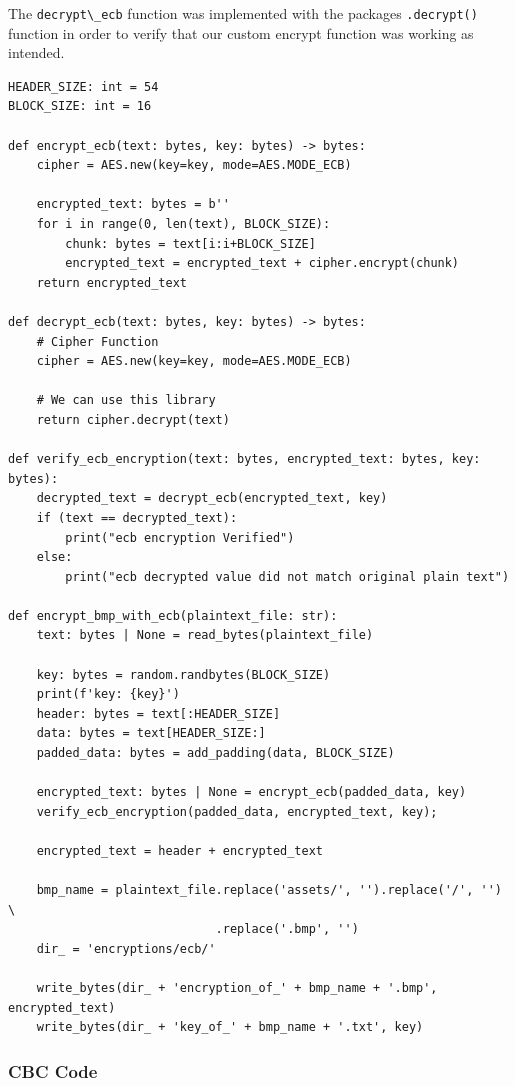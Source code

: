\documentclass[11pt]{article}
\begin{document}
The \verb|decrypt\_ecb| function was implemented with the packages \verb|.decrypt()| function in order to verify that our custom encrypt function was working as intended.

\begin{framed}
\begin{verbatim}
HEADER_SIZE: int = 54
BLOCK_SIZE: int = 16

def encrypt_ecb(text: bytes, key: bytes) -> bytes:
    cipher = AES.new(key=key, mode=AES.MODE_ECB)

    encrypted_text: bytes = b''
    for i in range(0, len(text), BLOCK_SIZE):
        chunk: bytes = text[i:i+BLOCK_SIZE]
        encrypted_text = encrypted_text + cipher.encrypt(chunk)
    return encrypted_text 

def decrypt_ecb(text: bytes, key: bytes) -> bytes:
    # Cipher Function
    cipher = AES.new(key=key, mode=AES.MODE_ECB)
    
    # We can use this library
    return cipher.decrypt(text)

def verify_ecb_encryption(text: bytes, encrypted_text: bytes, key: bytes):
    decrypted_text = decrypt_ecb(encrypted_text, key)
    if (text == decrypted_text):
        print("ecb encryption Verified")
    else:
        print("ecb decrypted value did not match original plain text")

def encrypt_bmp_with_ecb(plaintext_file: str):
    text: bytes | None = read_bytes(plaintext_file)

    key: bytes = random.randbytes(BLOCK_SIZE)
    print(f'key: {key}')
    header: bytes = text[:HEADER_SIZE]
    data: bytes = text[HEADER_SIZE:]
    padded_data: bytes = add_padding(data, BLOCK_SIZE)

    encrypted_text: bytes | None = encrypt_ecb(padded_data, key)
    verify_ecb_encryption(padded_data, encrypted_text, key);

    encrypted_text = header + encrypted_text

    bmp_name = plaintext_file.replace('assets/', '').replace('/', '') \
                             .replace('.bmp', '')
    dir_ = 'encryptions/ecb/'

    write_bytes(dir_ + 'encryption_of_' + bmp_name + '.bmp', encrypted_text)
    write_bytes(dir_ + 'key_of_' + bmp_name + '.txt', key)
\end{verbatim}
\end{framed}

\subsubsection*{CBC Code}
\end{document}
